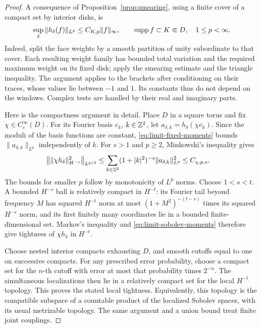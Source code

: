 \begin{proof}
A consequence of Proposition~\ref{prop:smearing}, using a finite
cover of a compact set by interior disks, is
\begin{equation}
 \sup_\delta\|h_\delta(f)\|_{L^p}
 \le C_{K,p}\|f\|_\infty,\qquad
 \operatorname{supp} f\subset K\Subset D,\quad 1\le p<\infty.
 \label{eq:limit-fixed-moments}
\end{equation}
Indeed, split the face weights by a smooth partition of unity
subordinate to that cover.  Each resulting weight family has bounded
total variation and the required maximum weight on its fixed disk;
apply the smearing estimate and the triangle inequality.  The argument
applies to the brackets after conditioning on their traces, whose
values lie between \(-1\) and \(1\).  Its constants thus do not depend
on the windows.  Complex tests are handled by their real and imaginary
parts.

Here is the compactness argument in detail.  Place \(D\) in a square
torus and fix \(\chi\in C_c^\infty(D)\).  For its Fourier basis
\(e_k\), \(k\in\mathbb Z^2\), let
\(a_{\delta,k}=h_\delta(\chi\overline{e_k})\).  Since the moduli of the
basis functions are constant, \eqref{eq:limit-fixed-moments} bounds
\(\|a_{\delta,k}\|_{L^p}\) independently of \(k\).  For \(s>1\) and
\(p\ge2\), Minkowski's inequality gives
\begin{align}
 \bigl\|\|\chi h_\delta\|_{H^{-s}}^2\bigr\|_{L^{p/2}}
 &\le
 \sum_{k\in\mathbb Z^2}(1+|k|^2)^{-s}
             \|a_{\delta,k}\|_{L^p}^2
 \le C_{\chi,p,s}.
 \label{eq:limit-sobolev-moments}
\end{align}
The bounds for smaller \(p\) follow by monotonicity of \(L^p\) norms.
Choose \(1<s<t\).  A bounded \(H^{-s}\) ball is relatively compact
in \(H^{-t}\): its Fourier tail beyond frequency \(M\) has squared
\(H^{-t}\) norm at most
\((1+M^2)^{-(t-s)}\) times its squared \(H^{-s}\) norm, and its
first finitely many coordinates lie in a bounded finite-dimensional
set.  Markov's inequality and \eqref{eq:limit-sobolev-moments}
therefore give tightness of \(\chi h_\delta\) in \(H^{-t}\).

Choose nested interior compacts exhausting \(D\), and smooth cutoffs
equal to one on successive compacts.  For any prescribed error
probability, choose a compact set for the \(n\)-th cutoff with error
at most that probability times \(2^{-n}\).  The simultaneous
localizations then lie in a relatively compact set for the local
\(H^{-t}\) topology.  This proves the stated local tightness.
Equivalently, this topology is the compatible subspace of a countable
product of the localized Sobolev spaces, with its usual metrizable
topology.  The same argument and a union bound treat finite joint
couplings.


\end{proof}
